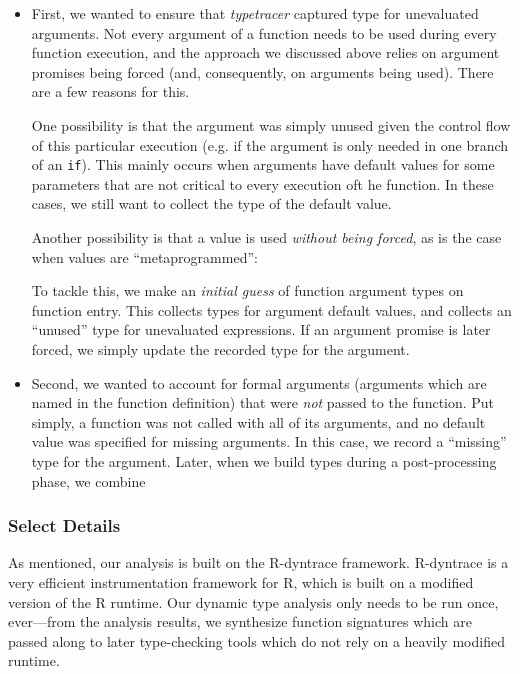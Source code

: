 \documentclass[acmsmall,review,anonymous]{acmart}\settopmatter{printfolios=true,printccs=false,printacmref=false}
\newcommand{\code}[1]{{\lstinline[style=Rin]!#1!}\xspace}
\newcommand{\typetracer}{\emph{typetracer}\xspace} %
\begin{document}
\begin{itemize}

\item First, we wanted to ensure that \typetracer captured type for unevaluated arguments. 
Not every argument of a function needs to be used during every function execution, and the approach we discussed above relies on argument promises being forced (and, consequently, on arguments being used).
There are a few reasons for this.

One possibility is that the argument was simply unused given the control flow of this particular execution (e.g. if the argument is only needed in one branch of an \code{if}).
This mainly occurs when arguments have default values for some parameters that are not critical to every execution oft he function.
In these cases, we still want to collect the type of the default value.

Another possibility is that a value is used {\it without being forced}, as is the case when values are ``metaprogrammed'': 

To tackle this, we make an {\it initial guess} of function argument types on function entry.
This collects types for argument default values, and collects an ``unused'' type for unevaluated expressions.
If an argument promise is later forced, we simply update the recorded type for the argument.

\item Second, we wanted to account for formal arguments (arguments which are named in the function definition) that were {\it not} passed to the function.
Put simply, a function was not called with all of its arguments, and no default value was specified for missing arguments.
In this case, we record a ``missing'' type for the argument.
Later, when we build types during a post-processing phase, we combine 


\end{itemize}


%
%
\subsubsection{Select Details}

As mentioned, our analysis is built on the R-dyntrace framework.
R-dyntrace is a very efficient instrumentation framework for R, which is built on a modified version of the R runtime.
Our dynamic type analysis only needs to be run once, ever---from the analysis results, we synthesize function signatures which are passed along to later type-checking tools which do not rely on a heavily modified runtime. 
\end{document}
